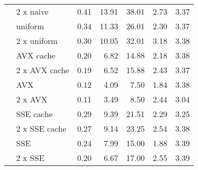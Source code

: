 \documentclass{stdlocal}
\begin{document}
\begin{tabular}{llrrrrr}
  & 2 x naive & 0.41 & 13.91 &    38.01 & 2.73 & 3.37 \\
  & uniform & 0.34 & 11.33 &    26.01 & 2.30 & 3.37 \\
  & 2 x uniform & 0.30 & 10.05 &    32.01 & 3.18 & 3.38 \\
  & AVX cache & 0.20 &  6.82 &    14.88 & 2.18 & 3.38 \\
  & 2 x AVX cache & 0.19 &  6.52 &    15.88 & 2.43 & 3.37 \\
  & AVX & 0.12 &  4.09 &     7.50 & 1.84 & 3.38 \\
  & 2 x AVX & 0.11 &  3.49 &     8.50 & 2.44 & 3.04 \\
  & SSE cache & 0.29 &  9.39 &    21.51 & 2.29 & 3.25 \\
  & 2 x SSE cache & 0.27 &  9.14 &    23.25 & 2.54 & 3.38 \\
  & SSE & 0.24 &  7.99 &    15.00 & 1.88 & 3.39 \\
  & 2 x SSE & 0.20 &  6.67 &    17.00 & 2.55 & 3.39 \\
  \hline
\end{tabular}
\end{document}
